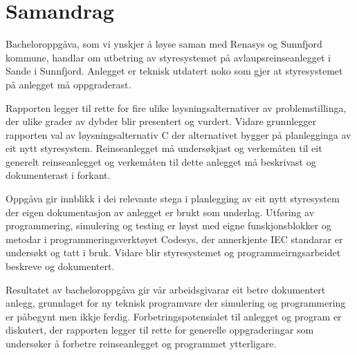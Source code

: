 \chapter{Samandrag}
\thispagestyle{romanpages}

Bacheloroppgåva, som vi ynskjer å løyse saman med Renasys og Sunnfjord kommune, handlar om utbetring av styresystemet på avlaupsreinseanlegget i Sande i Sunnfjord. 
Anlegget er teknisk utdatert noko som gjer at styresystemet på anlegget må oppgraderast.

Rapporten legger til rette for fire ulike løysningsalternativer av problemstillinga,
der ulike grader av dybder blir presentert og vurdert. \newline
Vidare grunnlegger rapporten val av løysningsalternativ C der alternativet bygger på planlegginga av eit nytt styresystem. 
Reinseanlegget må undersøkjast og 
verkemåten til eit generelt reinseanlegget og verkemåten til dette anlegget må beskrivast og dokumenterast i forkant.

Oppgåva gir innblikk i dei relevante stega i planlegging av eit nytt styresystem der eigen dokumentasjon av anlegget er brukt som underlag. 
Utføring av programmering, simulering og testing er løyst med eigne funskjonsblokker og metodar i programmeringsverktøyet Codesys,
der annerkjente IEC standarar er undersøkt og tatt i bruk.
Vidare blir styresystemet og programmeirngsarbeidet beskreve og dokumentert.

Resultatet av bacheloroppgåva gir vår arbeidsgivarar eit betre dokumentert anlegg, 
grunnlaget for ny teknisk programvare der simulering og programmering er påbegynt men ikkje ferdig. \newline
Forbetringspotensialet til anlegget og program er diskutert, der rapporten legger til rette for generelle oppgraderingar
som undersøker å forbetre reinseanlegget og programmet ytterligare.